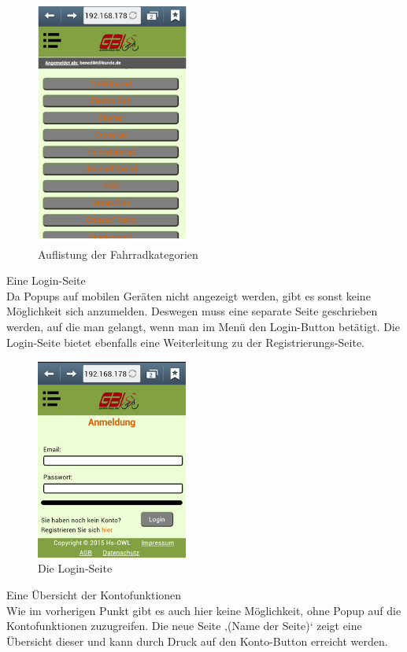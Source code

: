 \begin{figure}[H]
\begin{center}
\includegraphics[width=5cm]{Bilder/Michael_Abbildung7-AuflistungDerFahrradkategorien.png}
\end{center}
\caption{Auflistung der Fahrradkategorien}
\end{figure}

Eine Login-Seite
\\
Da Popups auf mobilen Geräten nicht angezeigt werden, gibt es sonst keine Möglichkeit sich anzumelden. Deswegen muss eine separate Seite geschrieben werden, auf die man gelangt, wenn man im Menü den Login-Button betätigt. Die Login-Seite bietet ebenfalls eine Weiterleitung zu der Registrierungs-Seite.

\begin{figure}[H]
\begin{center}
\includegraphics[width=5cm]{Bilder/Michael_Abbildung8-DieLogin-Seite.png}
\end{center}
\caption{Die Login-Seite}
\end{figure}

Eine Übersicht der Kontofunktionen
\\
Wie im vorherigen Punkt gibt es auch hier keine Möglichkeit, ohne Popup auf die Kontofunktionen zuzugreifen. Die neue Seite ‚(Name der Seite)‘ zeigt eine Übersicht dieser und kann durch Druck auf den Konto-Button erreicht werden.

